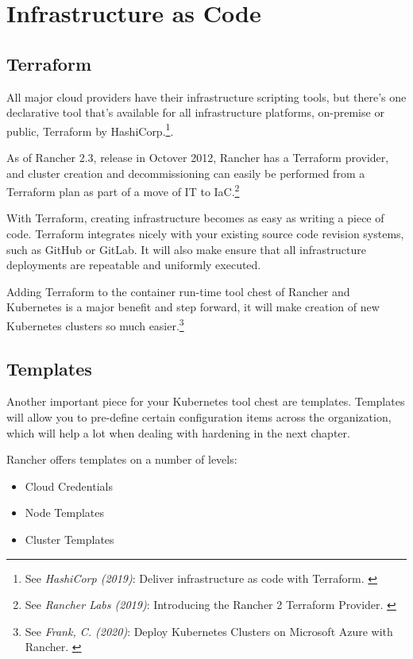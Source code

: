 %
%

\pagebreak
\section{Infrastructure as Code}

\onehalfspacing

\subsection{Terraform}

All major cloud providers have their infrastructure scripting tools, but there's one declarative tool that's available for all infrastructure platforms, on-premise or public, Terraform by HashiCorp.\footnote{See \textit{HashiCorp (2019)}: Deliver infrastructure as code with Terraform. \cite{terraform}}.

As of Rancher 2.3, release in Octover 2012, Rancher has a Terraform provider, and cluster creation and decommissioning can easily be performed from a Terraform plan as part of a move of IT to IaC.\footnote{See \textit{Rancher Labs (2019)}: Introducing the Rancher 2 Terraform Provider. \cite{terraformProvider}}

With Terraform, creating infrastructure becomes as easy as writing a piece of code. Terraform integrates nicely with your existing source code revision systems, such as GitHub or GitLab. It will also make ensure that all infrastructure deployments are repeatable and uniformly executed.

Adding Terraform to the container run-time tool chest of Rancher and Kubernetes is a major benefit and step forward, it will make creation of new Kubernetes clusters so much easier.\footnote{See \textit{Frank, C. (2020)}: Deploy Kubernetes Clusters on Microsoft Azure with Rancher. \cite{deployAzure}}

\subsection{Templates}

Another important piece for your Kubernetes tool chest are templates. Templates will allow you to pre-define certain configuration items across the organization, which will help a lot when dealing with hardening in the next chapter.

Rancher offers templates on a number of levels:

\begin{itemize}
\item Cloud Credentials
\item Node Templates
\item Cluster Templates
\end{itemize}

